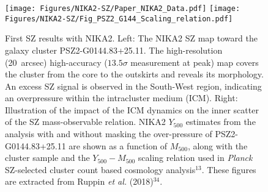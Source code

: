 {\color{vert}\lipsum[2-5]}

\begin{figure}
  \centering
  \texttt{[image: Figures/NIKA2-SZ/Paper\_NIKA2\_Data.pdf]}
  \texttt{[image: Figures/NIKA2-SZ/Fig\_PSZ2\_G144\_Scaling\_relation.pdf]}
  \caption{First SZ results with NIKA2. Left: The NIKA2 SZ map toward the galaxy cluster PSZ2-G0144.83+25.11. The high-resolution (20~arcsec) high-accuracy ($13.5\sigma $ measurement at peak) map covers the cluster from the core to the outskirts and reveals its morphology. An excess SZ signal is observed in the South-West region, indicating an overpressure within the intracluster medium (ICM). Right: Illustration of the impact of the ICM dynamics on the inner scatter of the SZ mass-observable relation. NIKA2 $Y_{500}$ estimates from the analysis with and without masking the over-pressure of PSZ2-G0144.83+25.11 are shown as a function of $M_{500}$, along with the cluster sample and the $Y_{500}-M_{500}$ scaling relation used in \emph{Planck} SZ-selected cluster count based cosmology analysis$^{13}$. These figures are extracted from Ruppin {\it et al.} (2018)$^{34}$. }
  \label{fig:nika2-sz}
\end{figure}

{\color{vert}\lipsum[2-5]}
